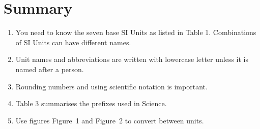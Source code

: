     \section{Summary}
            \nopagebreak
      \label{m30853*id67985}\begin{enumerate}[noitemsep, label=\textbf{\arabic*}. ] 
            \label{m30853*uid58}\item You need to know the seven base SI Units as listed in Table 1. Combinations of SI Units can have different names.
\label{m30853*uid59}\item Unit names and abbreviations are written with lowercase letter unless it is named after a person.
\label{m30853*uid60}\item Rounding numbers and using scientific notation is important.
\label{m30853*uid61}\item Table 3 summarises the prefixes used in Science.
\label{m30853*uid62}\item Use figures Figure~1 and Figure~2 to convert between units.
\end{enumerate}
